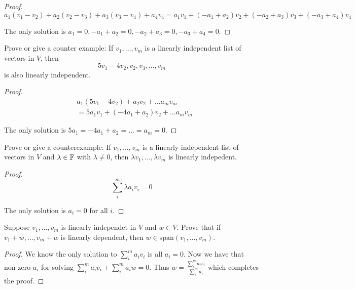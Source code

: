 \documentclass{extarticle}
\begin{document}
\begin{proof}

    \[a_1(v_1 - v_2) + a_2 (v_2 - v_3) + a_3 (v_3 - v_4) + a_4 v_4 = a_1v_1 
    + (-a_1 + a_2)v_2 + (-a_2 + a_3)v_3 + (-a_3 + a_4) v_4\]

    The only solution is \(a_1 = 0, -a_1 + a_2 = 0, -a_2 + a_3 = 0, -a_3 + a_4 = 0\).
\end{proof}


\begin{problem}{9}
    Prove or give a counter example: If \(v_1, \ldots, v_m\) is a linearly independent 
    list of vectors in \(V\), then 
    \[5v_1 - 4v_2, v_2, v_3, \ldots, v_m\]
    is also linearly independent.
\end{problem}

\begin{proof}

\begin{align*}
    &a_1 (5v_1 - 4v_2) + a_2 v_2 + \ldots a_m v_m \\ 
    &=5a_1 v_1 + (-4a_1  + a_2)v_2 + \ldots a_m v_m
\end{align*}

The only solution is \(5a_1 = -4a_1 + a_2 = \ldots = a_m = 0\).

\end{proof}


\begin{problem}{10}
    Prove or give a counterexample: If \(v_1, \ldots, v_m\) is a linearly 
    independent list of vectors in \(V\)  and \(\lambda \in \mathbb{F}\) with 
    \(\lambda \neq 0\), then \(\lambda v_1, \ldots, \lambda v_m\) is linearly 
    indepedent.
\end{problem}

\begin{proof}
\[\sum_{i}^m \lambda a_i v_i = 0\]

The only solution is \(a_i = 0\) for all \(i\).
\end{proof}

\begin{problem}{12}
    Suppose \(v_1, \ldots, v_m\) is linearly independet in \(V\) 
    and \(w \in V\). Prove that if \(v_1 + w, \ldots, v_m + w\) is 
    linearly dependent, then \(w \in \text{span}(v_1, \ldots, v_m)\).
\end{problem}

\begin{proof}
We know the only solution to \(\sum_i^m a_i v_i\) is all \(a_i = 0\). Now 
we have that non-zero \(a_i\) for solving \(\sum_i^m a_i v_i + \sum_i^m a_i w = 0\).
Thus \(w = \frac{\sum_i^m a_i v_i}{\sum_i^m a_i}\) which completes the proof.  
\end{proof}
\end{document}
